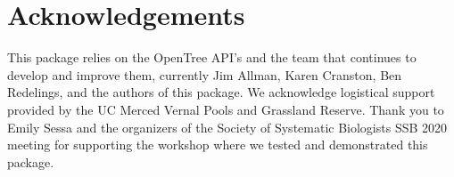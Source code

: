\documentclass[oupdraft]{sysbio_sse}
\begin{document}
\section{Acknowledgements}
This package relies on the OpenTree API's and the team that continues to develop and improve them, currently Jim Allman, Karen Cranston, Ben Redelings, and the authors of this package. We acknowledge logistical support provided by the UC Merced Vernal Pools and Grassland Reserve.
Thank you to Emily Sessa and the organizers of the Society of Systematic Biologists SSB 2020 meeting for supporting the workshop where we tested and demonstrated this package.


\bigskip\bigskip








\end{document}
